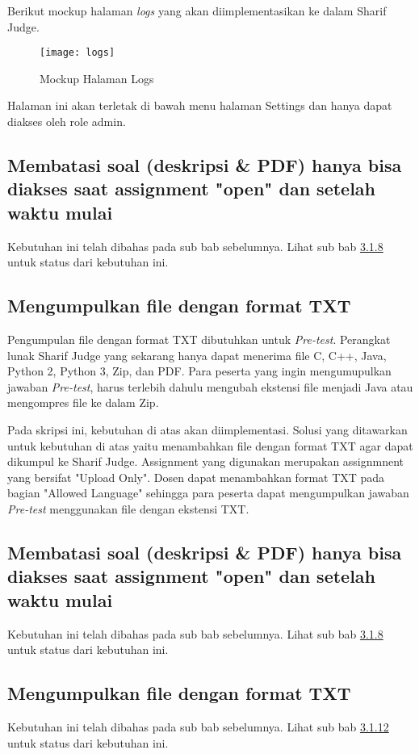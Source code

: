 Berikut mockup halaman \textit{logs} yang akan diimplementasikan ke dalam Sharif Judge.
\begin{figure}[H]
	\centering  
	\texttt{[image: logs]}  
	\caption[Mockup Halaman Logs]{Mockup Halaman Logs} 
	\label{fig:logs} 
\end{figure}
Halaman ini akan terletak di bawah menu halaman Settings dan hanya dapat diakses oleh role admin.

\subsection{Membatasi soal (deskripsi \& PDF) hanya bisa diakses saat assignment "open" dan setelah waktu mulai}
Kebutuhan ini telah dibahas pada sub bab sebelumnya. Lihat sub bab \hyperref[subsec:membatasisoal]{3.1.8} untuk status dari kebutuhan ini.

\subsection{Mengumpulkan file dengan format TXT}
\label{subsec:filetxt}
Pengumpulan file dengan format TXT dibutuhkan untuk \textit{Pre-test}. Perangkat lunak Sharif Judge yang sekarang hanya dapat menerima file C, C++, Java, Python 2, Python 3, Zip, dan PDF. Para peserta yang ingin mengumupulkan jawaban \textit{Pre-test}, harus terlebih dahulu mengubah ekstensi file menjadi Java atau mengompres file ke dalam Zip. 

Pada skripsi ini, kebutuhan di atas akan diimplementasi. Solusi yang ditawarkan untuk kebutuhan di atas yaitu menambahkan file dengan format TXT agar dapat dikumpul ke Sharif Judge. Assignment yang digunakan merupakan assignmnent yang bersifat "Upload Only". Dosen dapat menambahkan format TXT pada bagian "Allowed Language" sehingga para peserta dapat mengumpulkan jawaban \textit{Pre-test} menggunakan file dengan ekstensi TXT.

\subsection{Membatasi soal (deskripsi \& PDF) hanya bisa diakses saat assignment "open" dan setelah waktu mulai}
Kebutuhan ini telah dibahas pada sub bab sebelumnya. Lihat sub bab \hyperref[subsec:membatasisoal]{3.1.8} untuk status dari kebutuhan ini.

\subsection{Mengumpulkan file dengan format TXT}
Kebutuhan ini telah dibahas pada sub bab sebelumnya. Lihat sub bab \hyperref[subsec:filetxt]{3.1.12} untuk status dari kebutuhan ini.

